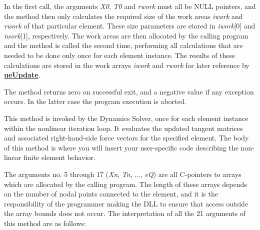 In the first call, the arguments {\sl X0}, {\sl T0} and {\sl rwork} must all be
NULL pointers, and the method then only calculates the required size of the work
areas {\sl iwork} and {\sl rwork} of that particular element.
These size parameters are stored in {\sl iwork}{[}0{]} and {\sl iwork}{[}1{]},
respectively. The work areas are then allocated by the calling program and the
method is called the second time, performing all calculations that are needed
to be done only once for each element instance.
The results of these calculations are stored in the work arrays {\sl iwork} and
{\sl rwork} for later reference by \protect\hyperlink{ueupdate}{\bf ueUpdate}.

The method returns zero on successful exit, and a negative value if any
exception occurs. In the latter case the program execution is aborted.


This method is invoked by the Dynamics Solver, once for each element instance
within the nonlinear iteration loop. It evaluates the updated tangent matrices
and associated right-hand-side force vectors for the specified element.
The body of this method is where you will insert your user-specific code
describing the non-linear finite element behavior.

The arguments no. 5 through 17 ({\sl Xn}, {\sl Tn}, ..., {\sl eQ})
are all C-pointers to arrays which are allocated by the calling program.
The length of these arrays depends on the number of nodal points connected
to the element, and it is the responsibility of the programmer making the DLL
to ensure that access outside the array bounds does not occur.
The interpretation of all the 21 arguments of this method are as follows:

